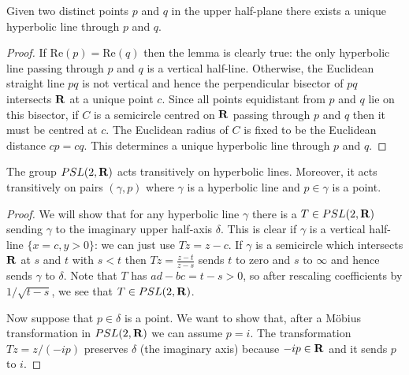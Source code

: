 \documentclass[12pt]{article}
\begin{document}
\begin{lma}
  Given two distinct points $p$ and $q$ in the upper half-plane there exists a unique hyperbolic line through $p$ and $q$.
\end{lma}
\begin{proof}
  If $\mathrm{Re}(p)=\mathrm{Re}(q)$ then the lemma is clearly true: the only hyperbolic line passing through $p$ and $q$ is a vertical half-line. Otherwise, the Euclidean straight line $pq$ is not vertical and hence the perpendicular bisector of $pq$ intersects $\mathbf{R}$ at a unique point $c$. Since all points equidistant from $p$ and $q$ lie on this bisector, if $C$ is a semicircle centred on $\mathbf{R}$ passing through $p$ and $q$ then it must be centred at $c$. The Euclidean radius of $C$ is fixed to be the Euclidean distance $cp=cq$. This determines a unique hyperbolic line through $p$ and $q$.
\end{proof}

\begin{lma}
  The group $PSL(2,\mathbf{R})$ acts transitively on hyperbolic lines. Moreover, it acts transitively on pairs $(\gamma,p)$ where $\gamma$ is a hyperbolic line and $p\in\gamma$ is a point.
\end{lma}
\begin{proof}
  We will show that for any hyperbolic line $\gamma$ there is a $T\in PSL(2,\mathbf{R})$ sending $\gamma$ to the imaginary upper half-axis $\delta$. This is clear if $\gamma$ is a vertical half-line $\{x=c,y>0\}$: we can just use $Tz=z-c$. If $\gamma$ is a semicircle which intersects $\mathbf{R}$ at $s$ and $t$ with $s<t$ then $Tz=\frac{z-t}{z-s}$ sends $t$ to zero and $s$ to $\infty$ and hence sends $\gamma$ to $\delta$. Note that $T$ has $ad-bc=t-s>0$, so after rescaling coefficients by $1/\sqrt{t-s}$, we see that $T\in PSL(2,\mathbf{R})$.

  Now suppose that $p\in\delta$ is a point. We want to show that, after a M\"obius transformation in $PSL(2,\mathbf{R})$ we can assume $p=i$. The transformation $Tz=z/(-ip)$ preserves $\delta$ (the imaginary axis) because $-ip\in\mathbf{R}$ and it sends $p$ to $i$.
\end{proof}
\end{document}
